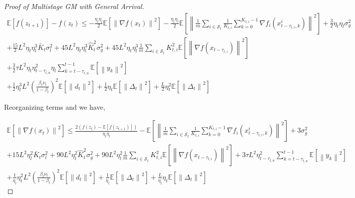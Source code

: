 \begin{proof}[Proof of Multistage GM with General Arrival]
\begin{equation}
\begin{gathered}
\mathbb{E}\left[f(z_{t+1})\right] - f(z_t) \leq 
- \frac{\eta_t\eta_l}{2} \mathbb{E}\left[\left\| \nabla f(x_t) \right\|^2\right] - \frac{\eta_t\eta_l}{2} \mathbb{E}\left[\left\| \frac{1}{m}\sum_{i\in\mathcal{S}_t} \frac{1}{K_{t,i}} \sum_{k=0}^{K_{t,i}-1} \nabla f_i(x_{t-\tau_{t,i},k}^i) \right\|^2\right] 
+ \frac{3}{2} \eta_t\eta_l \sigma_g^2 \\
+ \frac{15}{2}L^2\eta_t\eta_l^3\bar{K}_t\sigma_l^2+45L^2\eta_t\eta_l^3\hat{K}_t^2\sigma_g^2+45L^2\eta_t\eta_l^3 \frac{1}{m}\sum_{i\in\mathcal{S}_t}K_{t,i}^2\mathbb{E}\left[\left\| \nabla f(x_{t-\tau_{t,i}})\right\|^2\right]\\
+\frac{3}{2}\tau L^2\eta_t\eta_{t-\tau_{t,u}}^2\eta_l \sum_{k=t-\tau_{t,u}}^{t-1}\mathbb{E}\left[\left\|  y_k \right\|^2\right]\\
+ \frac{1}{2}\eta_t^3 L^2\left(\frac{\beta_t\nu_t}{1-\beta_t}\right)^2\mathbb{E}\left[\left\| d_t\right\|^2\right] + \frac{1}{2}\eta_t\mathbb{E}\left[\left\|\Delta_t\right\|^2\right]  + \frac{L}{2}\eta_t^2\mathbb{E}\left[\left\| \Delta_t\right\|^2\right]
\end{gathered}\nonumber
\end{equation}


Reorganizing terms and we have,

\begin{equation}
\begin{gathered}
 \mathbb{E}\left[\left\| \nabla f(x_t) \right\|^2\right]  \leq \frac{2\left(f(z_t) - \mathbb{E}\left[f(z_{t+1})\right]  \right)}{\eta_t\eta_l} - \mathbb{E}\left[\left\| \frac{1}{m}\sum_{i\in\mathcal{S}_t} \frac{1}{K_{t,i}} \sum_{k=0}^{K_{t,i}-1} \nabla f_i(x_{t-\tau_{t,i},k}^i) \right\|^2\right]
+ 3 \sigma_g^2 \\
+ 15 L^2 \eta_l^2\bar{K}_t\sigma_l^2+ 90 L^2 \eta_l^2 \hat{K}_t^2\sigma_g^2 + 90 L^2 \eta_l^2 \frac{1}{m}\sum_{i\in\mathcal{S}_t}K_{t,i}^2\mathbb{E}\left[\left\| \nabla f(x_{t-\tau_{t,i}})\right\|^2\right] + 3 \tau L^2 \eta_{t-\tau_{t,u}}^2  \sum_{k=t-\tau_{t,u}}^{t-1}\mathbb{E}\left[\left\|  y_k \right\|^2\right]\\
+ \frac{1}{\eta_l}\eta_t^2 L^2\left(\frac{\beta_t\nu_t}{1-\beta_t}\right)^2\mathbb{E}\left[\left\| d_t\right\|^2\right] + \frac{1}{\eta_l} \mathbb{E}\left[\left\|\Delta_t\right\|^2\right]  + \frac{L}{\eta_l}\eta_t\mathbb{E}\left[\left\| \Delta_t\right\|^2\right]
\end{gathered}\nonumber
\end{equation}


\end{proof}
